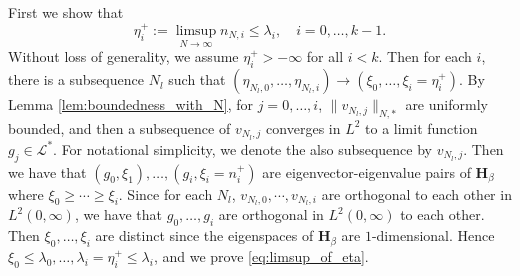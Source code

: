 \documentclass[11pt, a4paper]{article}
\numberwithin{equation}{section}
\newcommand{\Lstar}{\mathcal{L}^*}
\newcommand{\Hbeta}{\mathbf{H}_{\beta}}
\theoremstyle{definition}
\theoremstyle{remark}
\begin{document}
First we show that
\begin{equation} \label{eq:limsup_of_eta}
  \eta^+_i := \limsup_{N \to \infty} n_{N, i} \leq \lambda_i, \quad i = 0, \dotsc, k - 1.
\end{equation}
Without loss of generality, we assume $\eta^+_i > -\infty$ for all $i < k$. Then for each $i$, there is a subsequence $N_l$ such that $(\eta_{N_l, 0}, \dotsc, \eta_{N_l, i}) \to (\xi_0, \dotsc, \xi_i = \eta^+_i)$. By Lemma \ref{lem:boundedness_with_N}, for $j = 0, \dotsc, i$, $\lVert v_{N_l, j} \rVert_{N, *}$ are uniformly bounded, and then a subsequence of $v_{N_l, j}$ converges in $L^2$ to a limit function $g_j \in \Lstar$. For notational simplicity, we denote the also subsequence by $v_{N_l, j}$. Then we have that $(g_0, \xi_1), \dotsc, (g_i, \xi_i = n^+_i)$ are eigenvector-eigenvalue pairs of $\Hbeta$ where $\xi_0 \geq \dotsb \geq \xi_i$. Since for each $N_l$, $v_{N_l, 0}, \dotsb, v_{N_l, i}$ are orthogonal to each other in $L^2(0, \infty)$, we have that $g_0, \dotsc, g_i$ are orthogonal in $L^2(0, \infty)$ to each other. Then $\xi_0, \dotsc, \xi_i$ are distinct since the eigenspaces of $\Hbeta$ are $1$-dimensional. Hence $\xi_0 \leq \lambda_0, \dotsc, \lambda_i = \eta^+_i \leq \lambda_i$, and we prove \eqref{eq:limsup_of_eta}.
\end{document}
